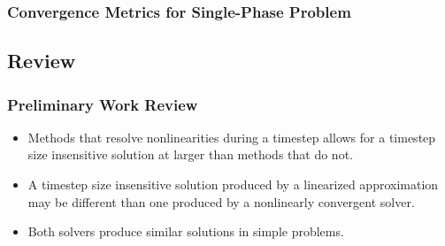 \documentclass[compress,xcolor=table]{beamer}
\begin{document}
\begin{frame}
\frametitle{Convergence Metrics for Single-Phase Problem}

\begin{table}[h!t]
\centering
{}
\end{table}

\end{frame}
\subsection[Review]{Review}
\begin{frame}
\frametitle{Preliminary Work Review}

\begin{itemize}
\item{Methods that resolve nonlinearities during a timestep allows for a timestep size insensitive solution at larger \dtmax{} than methods that do not.}
\item{A timestep size insensitive solution produced by a linearized approximation may be different than one produced by a nonlinearly convergent solver.}
\item{Both solvers produce similar solutions in simple problems.} 
\end{itemize}

\end{frame}
\end{document}
